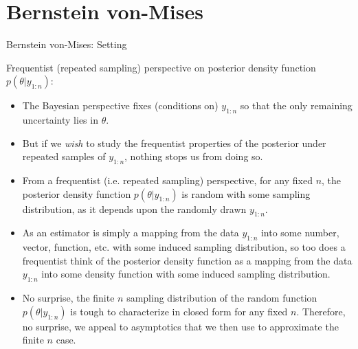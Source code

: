 \documentclass[aspectratio=169, handout]{beamer}
\begin{document}
\section{Bernstein von-Mises}

{\footnotesize
\begin{frame}{Bernstein von-Mises: Setting}

\alert{Frequentist} (repeated sampling) perspective on posterior
density function $p(\theta|y_{1:n})$:
\begin{itemize}
  \item The Bayesian perspective fixes (conditions on) $y_{1:n}$ so that the
    only remaining uncertainty lies in $\theta$.

  \item But if we \emph{wish} to study the frequentist properties of the
    posterior under repeated samples of $y_{1:n}$, nothing stops us from
    doing so.

  \item
    From a frequentist (i.e. repeated sampling) perspective, for any fixed
    $n$, the posterior density function $p(\theta|y_{1:n})$ is
    \alert{random} with some sampling distribution, as it depends upon the
    randomly drawn $y_{1:n}$.

  \item
    As an estimator is simply a \alert{mapping} from the data
    $y_{1:n}$ into some number, vector, function, etc. with some
    induced \alert{sampling distribution}, so too does a frequentist
    think of the \alert{posterior density function} as a mapping from
    the data $y_{1:n}$ into some density function with some induced
    sampling distribution.

  \item
    No surprise, the finite $n$ sampling distribution of
    the random function $p(\theta|y_{1:n})$ is tough to characterize in
    closed form for any fixed $n$.
    Therefore, no surprise, we appeal to \alert{asymptotics} that we
    then use to approximate the finite $n$ case.
\end{itemize}
\end{frame}
}
\end{document}
